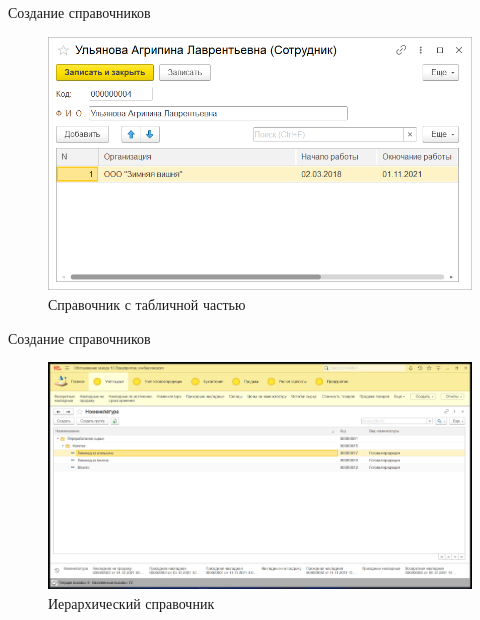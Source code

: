 \documentclass[12pt,a4paper,mathserif]{beamer}
\begin{document}
\begin{frame}{Создание справочников}
    \begin{figure}
        \centering
        \includegraphics[scale=0.6]{worker.png}
        \caption{Справочник с табличной частью}
        \label{fig:table}
    \end{figure}
\end{frame}

\begin{frame}{Создание справочников}
    \begin{figure}
        \centering
        \includegraphics[scale=0.25]{nomenclature.png}
        \caption{Иерархический справочник}
        \label{fig:nomenclature}
    \end{figure}
\end{frame}
\end{document}
